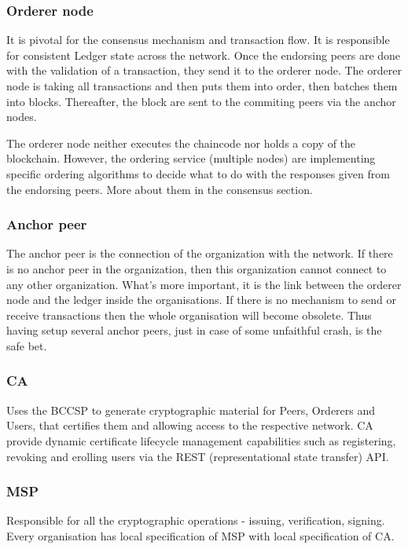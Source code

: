 \documentclass[a4paper,11pt]{report}
\begin{document}
\subsubsection{Orderer node}
It is pivotal for the consensus mechanism and transaction flow. It is responsible for consistent Ledger state across the network. Once the endorsing peers are done with the validation of a transaction, they send it to the orderer node. The orderer node is taking all transactions and then puts them into order, then batches them into blocks. Thereafter, the block are sent to the commiting peers via the anchor nodes.

	The orderer node neither executes the chaincode nor holds a copy of the blockchain. However, the ordering service (multiple nodes) are implementing specific ordering algorithms to decide what to do with the responses given from the endorsing peers. More about them in the consensus section.
\subsubsection{Anchor peer}
The anchor peer is the connection of the organization with the network. If there is no anchor peer in the organization, then this organization cannot connect to any other organization. What’s more important, it is the link between the orderer node and the ledger inside the organisations. If there is no mechanism to send or receive transactions then the whole organisation will become obsolete. Thus having setup several anchor peers, just in case of some unfaithful crash, is the safe bet.  

 
\subsubsection{CA}

Uses the BCCSP to generate cryptographic material for Peers, Orderers and Users, that certifies them and allowing access to the respective network. CA provide dynamic certificate lifecycle management capabilities such as registering, revoking and erolling users via the REST (representational state transfer) API.\cite{mencias2018optimized}

\subsubsection{MSP}

Responsible for all the cryptographic operations - issuing, verification, signing. Every organisation has local specification of MSP with local specification of CA.
\end{document}
